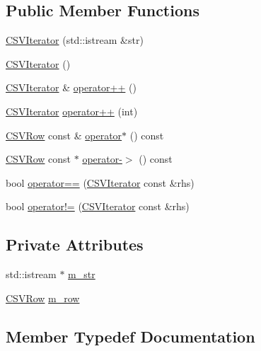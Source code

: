 \subsection*{Public Member Functions}
\begin{DoxyCompactItemize}
\item 
\hyperlink{class_c_s_v_iterator_a5e1ec4423e05bf23c4209f3089d8e0b2}{C\+S\+V\+Iterator} (std\+::istream \&str)
\item 
\hyperlink{class_c_s_v_iterator_a8c3e1708c84d80dc8b51822547f2c2aa}{C\+S\+V\+Iterator} ()
\item 
\hyperlink{class_c_s_v_iterator}{C\+S\+V\+Iterator} \& \hyperlink{class_c_s_v_iterator_a5bac2b8aaf235c2ee1b0b2b9da9b3399}{operator++} ()
\item 
\hyperlink{class_c_s_v_iterator}{C\+S\+V\+Iterator} \hyperlink{class_c_s_v_iterator_ab3f320940c36f5524865b349e6d1b36b}{operator++} (int)
\item 
\hyperlink{class_c_s_v_row}{C\+S\+V\+Row} const \& \hyperlink{class_c_s_v_iterator_a0577e6c41cd7f595762f84736d751c38}{operator$\ast$} () const 
\item 
\hyperlink{class_c_s_v_row}{C\+S\+V\+Row} const $\ast$ \hyperlink{class_c_s_v_iterator_aea83ae54c091c545a462d4152e06bf5f}{operator-\/$>$} () const 
\item 
bool \hyperlink{class_c_s_v_iterator_a75dbe096c1a074b74dadd7ab2283f3e9}{operator==} (\hyperlink{class_c_s_v_iterator}{C\+S\+V\+Iterator} const \&rhs)
\item 
bool \hyperlink{class_c_s_v_iterator_a4ba4b13be1e878cfd1a9c9e6d69f9a62}{operator!=} (\hyperlink{class_c_s_v_iterator}{C\+S\+V\+Iterator} const \&rhs)
\end{DoxyCompactItemize}
\subsection*{Private Attributes}
\begin{DoxyCompactItemize}
\item 
std\+::istream $\ast$ \hyperlink{class_c_s_v_iterator_abb34432d545dcb80447b020fe8a47cad}{m\+\_\+str}
\item 
\hyperlink{class_c_s_v_row}{C\+S\+V\+Row} \hyperlink{class_c_s_v_iterator_a051522e4a6e5097f0348869455c2eddd}{m\+\_\+row}
\end{DoxyCompactItemize}


\subsection{Member Typedef Documentation}
